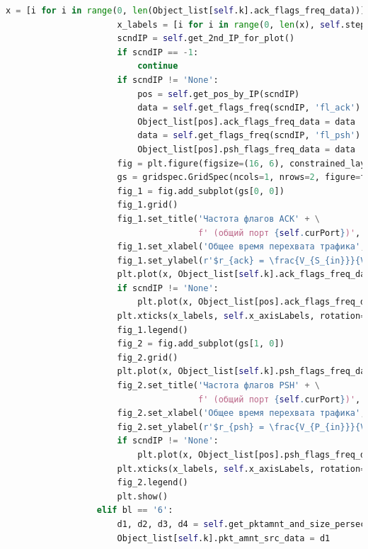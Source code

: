 \documentclass[bachelor, och, coursework]{SCWorks}
\begin{document}
\begin{lstlisting}[language=Python]
                      x = [i for i in range(0, len(Object_list[self.k].ack_flags_freq_data))]
                      x_labels = [i for i in range(0, len(x), self.step)]
                      scndIP = self.get_2nd_IP_for_plot()
                      if scndIP == -1:
                          continue
                      if scndIP != 'None':
                          pos = self.get_pos_by_IP(scndIP)
                          data = self.get_flags_freq(scndIP, 'fl_ack')
                          Object_list[pos].ack_flags_freq_data = data
                          data = self.get_flags_freq(scndIP, 'fl_psh')
                          Object_list[pos].psh_flags_freq_data = data
                      fig = plt.figure(figsize=(16, 6), constrained_layout=True)
                      gs = gridspec.GridSpec(ncols=1, nrows=2, figure=fig)
                      fig_1 = fig.add_subplot(gs[0, 0])
                      fig_1.grid()
                      fig_1.set_title('Частота флагов ACK' + \
                                      f' (общий порт {self.curPort})', fontsize=15 )
                      fig_1.set_xlabel('Общее время перехвата трафика', fontsize=15)
                      fig_1.set_ylabel(r'$r_{ack} = \frac{V_{S_{in}}}{V_{tcp}}$', fontsize=15)
                      plt.plot(x, Object_list[self.k].ack_flags_freq_data, 'b', label=self.curIP)
                      if scndIP != 'None':
                          plt.plot(x, Object_list[pos].ack_flags_freq_data, 'r', label=scndIP)
                      plt.xticks(x_labels, self.x_axisLabels, rotation=30, fontsize=8)
                      fig_1.legend()
                      fig_2 = fig.add_subplot(gs[1, 0])
                      fig_2.grid()
                      plt.plot(x, Object_list[self.k].psh_flags_freq_data, 'orange', label=self.curIP)
                      fig_2.set_title('Частота флагов PSH' + \
                                      f' (общий порт {self.curPort})', fontsize=15 )
                      fig_2.set_xlabel('Общее время перехвата трафика', fontsize=15)
                      fig_2.set_ylabel(r'$r_{psh} = \frac{V_{P_{in}}}{V_{tcp}}$', fontsize=15)
                      if scndIP != 'None':
                          plt.plot(x, Object_list[pos].psh_flags_freq_data, 'g', label=scndIP)
                      plt.xticks(x_labels, self.x_axisLabels, rotation=30, fontsize=8)
                      fig_2.legend()
                      plt.show()
                  elif bl == '6':
                      d1, d2, d3, d4 = self.get_pktamnt_and_size_persec(self.curIP)
                      Object_list[self.k].pkt_amnt_src_data = d1

\end{lstlisting}
\end{document}
